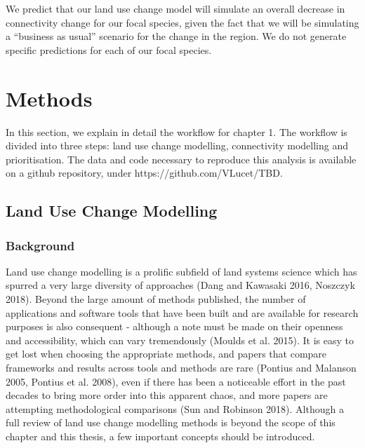 We predict that our land use change model will simulate an overall decrease in connectivity change for our focal species, given the fact that we will be simulating a “business as usual” scenario for the change in the region. We do not generate specific predictions for each of our focal species.\\

\section{Methods}
In this section, we explain in detail the workflow for chapter 1. The workflow is divided into three steps: land use change modelling, connectivity modelling and prioritisation. The data and code necessary to reproduce this analysis is available on a github repository, under https://github.com/VLucet/TBD.\\

\subsection{Land Use Change Modelling}

\subsubsection{Background}
Land use change modelling is a prolific subfield of land systems science which has spurred a very large diversity of approaches (Dang and Kawasaki 2016, Noszczyk 2018). Beyond the large amount of methods published, the number of applications and software tools that have been built and are available for research purposes is also consequent - although a note must be made on their openness and accessibility, which can vary tremendously (Moulds et al. 2015). It is easy to get lost when choosing the appropriate methods, and papers that compare frameworks and results across tools and methods are rare (Pontius and Malanson 2005, Pontius et al. 2008), even if there has been a noticeable effort in the past decades to bring more order into this apparent chaos, and  more papers are attempting methodological comparisons (Sun and Robinson 2018). Although a full review of land use change modelling methods is beyond the scope of this chapter and this thesis, a few important concepts should be introduced.

